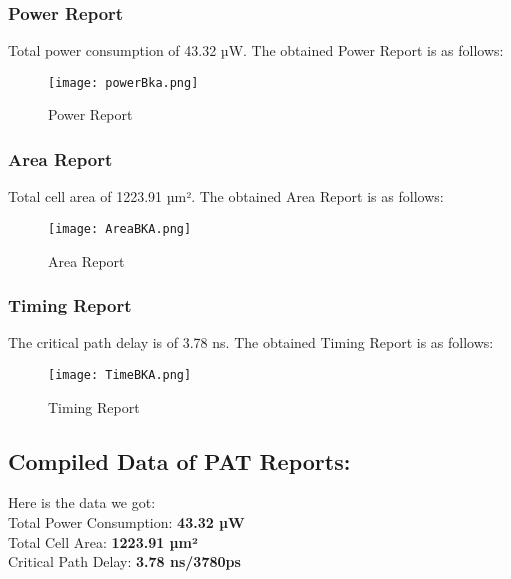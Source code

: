 \documentclass{IEEEtran}
\begin{document}
\subsubsection{\textbf{Power Report}}
Total power consumption of 43.32 µW.
The obtained Power Report is as follows:
\begin{figure}[H]
    \centering
    \texttt{[image: powerBka.png]}
    \caption{Power Report}
    \label{fig:enter-label}
\end{figure}
\subsubsection{\textbf{Area Report}}
Total cell area of 1223.91 µm².
The obtained Area Report is as follows:
\begin{figure}[H]
    \centering
    \texttt{[image: AreaBKA.png]}
    \caption{Area Report}
    \label{fig:enter-label}
\end{figure}
\subsubsection{\textbf{Timing Report}}
The critical path delay is of 3.78 ns.
The obtained Timing Report is as follows:
\begin{figure}[H]
    \centering
    \texttt{[image: TimeBKA.png]}
    \caption{Timing Report}
    \label{fig:enter-label}
\end{figure}
\subsection{Compiled Data of PAT Reports:
}
Here is the data we got:\\
Total Power Consumption: \textbf{43.32 µW}\\
Total Cell Area: \textbf{1223.91 µm²}\\
Critical Path Delay: \textbf{3.78 ns/3780ps}
\end{document}
